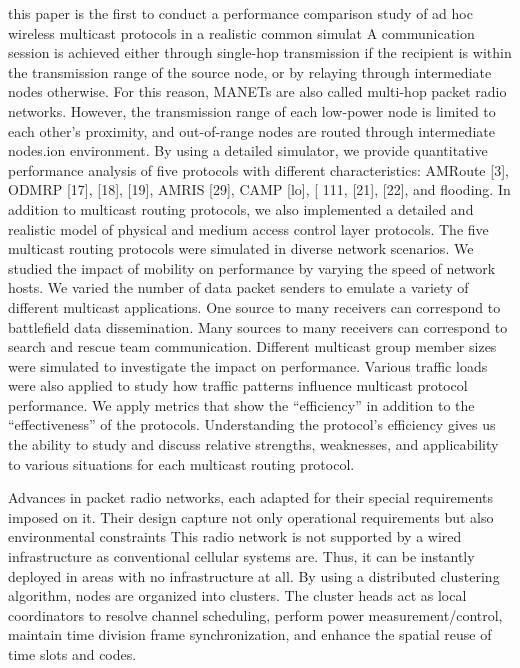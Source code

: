 \documentclass[letterpaper, 10 pt, conference]{ieeeconf}  %
\begin{document}
 this paper is the first to conduct
a performance comparison study of ad hoc wireless multicast
protocols in a realistic common simulat A communication session is achieved either
through single-hop transmission if the recipient is
within the transmission range of the source node,
or by relaying through intermediate nodes otherwise.
For this reason, MANETs are also called
multi-hop packet radio networks. However, the
transmission range of each low-power node is limited
to each other’s proximity, and out-of-range
nodes are routed through intermediate nodes.ion environment. By using
a detailed simulator, we provide quantitative performance
analysis of five protocols with different characteristics: AMRoute
[3], ODMRP [17], [18], [19], AMRIS [29], CAMP [lo],
[ 111, [21], [22], and flooding. In addition to multicast routing
protocols, we also implemented a detailed and realistic model of
physical and medium access control layer protocols.
The five multicast routing protocols were simulated in diverse
network scenarios. We studied the impact of mobility on performance
by varying the speed of network hosts. We varied the
number of data packet senders to emulate a variety of different
multicast applications. One source to many receivers can correspond
to battlefield data dissemination. Many sources to many
receivers can correspond to search and rescue team communication.
Different multicast group member sizes were simulated
to investigate the impact on performance. Various traffic loads
were also applied to study how traffic patterns influence multicast
protocol performance. We apply metrics that show the
“efficiency” in addition to the “effectiveness” of the protocols.
Understanding the protocol’s efficiency gives us the ability to
study and discuss relative strengths, weaknesses, and applicability
to various situations for each multicast routing protocol.



Advances in packet radio networks, each adapted for their special requirements imposed on it. Their design capture not only operational requirements but also environmental constraints \cite{Ephremides1987ASignaling} \cite{Gerla1995MulticlusterNetwork} This radio network is not supported by a wired infrastructure as conventional cellular systems are. Thus, it can be instantly deployed in areas with no infrastructure at all. By using a distributed clustering algorithm, nodes are organized into clusters. The cluster heads act as local coordinators to resolve channel scheduling, perform power measurement/control, maintain time division frame synchronization, and enhance the spatial reuse of time slots and codes.
\end{document}
